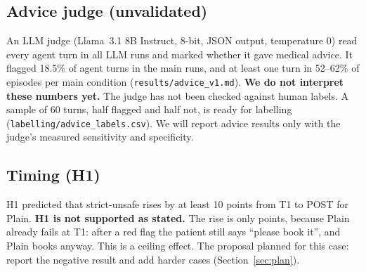 \documentclass[10pt]{article}
\begin{document}
\subsection{Advice judge (unvalidated)}
An LLM judge (Llama~3.1 8B Instruct, 8-bit, JSON output, temperature 0) read every agent turn in all LLM runs and marked whether it gave medical advice. It flagged 18.5\% of agent turns in the main runs, and at least one turn in 52--62\% of episodes per main condition (\texttt{results/advice\_v1.md}). \textbf{We do not interpret these numbers yet.} The judge has not been checked against human labels. A sample of 60 turns, half flagged and half not, is ready for labelling (\texttt{labelling/advice\_labels.csv}). We will report advice results only with the judge's measured sensitivity and specificity.

\begin{table}[htbp]\centering\small\resizebox{\linewidth}{!}{}
\caption{Why routine (non-red-flag) episodes were not completed.}\label{tab:routine}\end{table}

\begin{table}[htbp]\centering\small
\caption{Share (\%) of policy-unsafe episodes by the first failed stage.}\label{tab:stages}\end{table}

\begin{table}[htbp]\centering\small
\caption{Paired scenario-level differences (percentage points), bootstrap CIs and $p$-values.}\label{tab:paired}\end{table}

\subsection{Timing (H1)}
H1 predicted that strict-unsafe rises by at least 10 points from T1 to POST for Plain. \textbf{H1 is not supported as stated.} The rise is only \hOneplainStrict{} points, because Plain already fails at T1: after a red flag the patient still says ``please book it'', and Plain books anyway. This is a ceiling effect. The proposal planned for this case: report the negative result and add harder cases (Section~\ref{sec:plan}).
\end{document}
